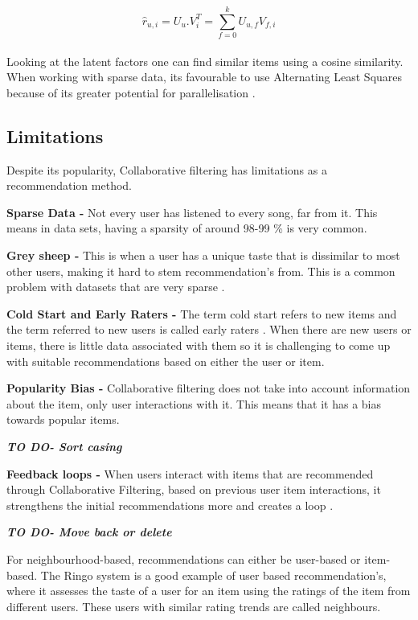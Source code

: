 \begin{equation}
	\hat{r} _{u,i} = U _{u} . V _{i}^{T} = \sum_{f=0}^{k} U_{u,f} V_{f, i}
\end{equation}
\\
Looking at the latent factors one can find  similar items using a cosine similarity. When working with sparse data, its favourable to use Alternating Least Squares because of its greater potential for parallelisation \citep{koren_matrix_2009}.

\subsection{Limitations}
Despite its popularity, Collaborative filtering has limitations as a recommendation method.

\textbf{Sparse Data - }Not every user has listened to every song, far from it. This means in data sets, having a sparsity of around 98-99 \% is very common.

\textbf{Grey sheep - }This is when a user has a unique taste that is dissimilar to most other users, making it hard to stem recommendation's from. This is a common problem with datasets that are very sparse \citep{claypool_combining_1999}.

\textbf{Cold Start and Early Raters - } The term cold start refers to new items and the term referred to new users is called early raters \citep{avery_recommender_1997}. When there are new users or items, there is little data associated with them so it is challenging to come up with suitable recommendations based on either the user or item. 

\textbf{Popularity Bias - } Collaborative filtering does not take into account information about the item, only user interactions with it. This means that it has a bias towards popular items.

\textbf{\textit{TO DO- Sort casing}}

\textbf{Feedback loops - } When users interact with items that are recommended through Collaborative Filtering, based on previous user item interactions, it strengthens the initial recommendations more and creates a loop \citep{sanchez-moreno_incorporating_2018}.


\textbf{\textit{TO DO- Move back or delete}}

For neighbourhood-based, recommendations can either be user-based or item-based. The Ringo system is a good example of user based recommendation's, where it assesses the taste of a user for an item using the ratings of the item from different users. These users with similar rating trends are called neighbours. 

